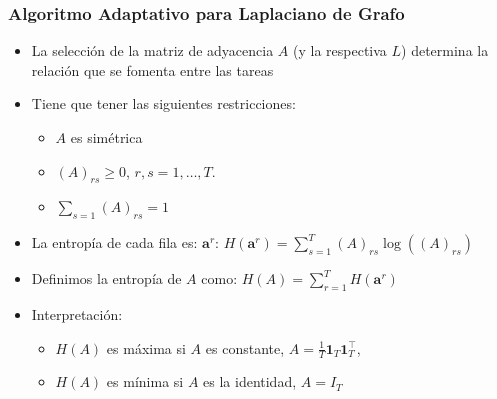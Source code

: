 \documentclass[aspectratio=43]{beamer}
\newcommand{\norm}[1]{\left\lVert#1\right\rVert}
\newcommand{\opt}[1]{{#1}^*}
\newcommand{\myvec}[1]{\bm{#1}}
\newcommand{\fv}[1]{\myvec{#1}}
\newcommand{\ntasks}{T}
\begin{document}
\begin{frame}
      \frametitle{Algoritmo Adaptativo para Laplaciano de Grafo}

      \begin{itemize}
            \item La selección de la matriz de adyacencia $A$ (y la respectiva $L$) determina la relación que se fomenta entre las tareas
            \item Tiene que tener las siguientes restricciones:
            \begin{itemize}
                  \item $A$ es simétrica
                  \item $(A)_{rs} \geq 0$, $r, s=1, \ldots, \ntasks$.
                  \item $\sum_{s=1} (A)_{rs} = 1$
              \end{itemize}
            \item La entropía de cada fila es: $\fv{a}^r$: $H(\fv{a}^r) = \sum_{s=1}^\ntasks (A)_{rs} \log((A)_{rs})$
            \item Definimos la entropía de $A$ como: $H(A) = \sum_{r=1}^\ntasks H(\fv{a}^r)$
            \item Interpretación:
            \begin{itemize}
                  \item $H(A)$ es máxima si $A$ es constante, $A = \frac{1}{\ntasks} \fv{1}_\ntasks \fv{1}_\ntasks^\intercal$, 
                  \item $H(A)$ es mínima si $A$ es la identidad, $A = I_\ntasks$ 
            \end{itemize}
            
      \end{itemize}

\end{frame}
\end{document}
